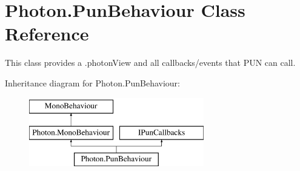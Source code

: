 \hypertarget{class_photon_1_1_pun_behaviour}{}\section{Photon.\+Pun\+Behaviour Class Reference}
\label{class_photon_1_1_pun_behaviour}


This class provides a .photon\+View and all callbacks/events that P\+UN can call.  


Inheritance diagram for Photon.\+Pun\+Behaviour\+:\begin{figure}[H]
\begin{center}
\leavevmode
\includegraphics[height=3.000000cm]{class_photon_1_1_pun_behaviour}
\end{center}
\end{figure}
